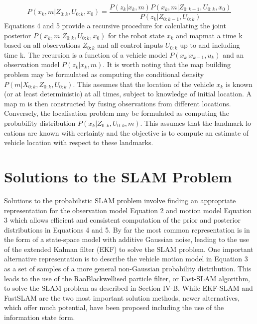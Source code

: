 \documentclass[12pt]{article}
\begin{document}
\begin{equation}
P(x_k,m| Z_{0:k},U_{0:k},x_0)=\frac{P(z_k | x_k,m)P(x_k,m| Z_{0:k-1},U_{0:k},x_0)}{ P(z_k | Z_{0:k-1},U_{0:k})}
\end{equation}
Equations 4 and 5 provide a recursive procedure for calculating the joint posterior $P(x_k,m| Z_{0:k},U_{0:k},x_0)$ for the robot state $x_k$ and mapmat a time k based on all observations $Z_{0:k}$ and all control inputs $U_{0:k}$ up to and including time k. The recursion is a function of a vehicle model $P(x_k | x_{k-1},u_k)$ and an observation model $P(z_k | x_k,m)$. It is worth noting that the map building problem may be formulated as computing the conditional density $P(m| X_{0:k},Z_{0:k},U_{0:k})$. This assumes that the location of the vehicle $x_k$ is known (or at least deterministic) at all times, subject to knowledge of initial location. A map
m is then constructed by fusing observations from different locations. Conversely, the localisation problem may be formulated as computing the probability distribution $P(x_k | Z_{0:k},U_{0:k},m)$. This assumes that the landmark lo- cations are known with certainty and the objective is to compute an estimate of vehicle location with respect to these landmarks.
\section{Solutions to the SLAM Problem}
Solutions to the probabilistic SLAM problem involve finding an appropriate representation for the observation model Equation 2 and motion model Equation 3 which allows efficient and consistent computation of the prior and posterior distributions in Equations 4 and 5. By far the most common representation is in the form of a state-space model with additive Gaussian noise, leading to the use of the extended Kalman filter (EKF) to solve the SLAM problem. One important alternative representation is to describe the vehicle motion model in Equation 3 as a set of samples of a more general non-Gaussian probability distribution. This leads to the use of the RaoBlackwellised particle filter, or Fast-SLAM algorithm, to solve the SLAM problem as described in Section IV-B. While EKF-SLAM and FastSLAM are the two most important solution methods, newer alternatives, which offer much potential, have been proposed including the use of the information state form.
\end{document}
